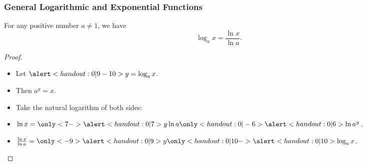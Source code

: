 \begin{frame}
\frametitle{General Logarithmic and Exponential Functions}
\begin{theorem}
For any positive number $a \neq 1$, we have
\[
\log_a x = \frac{\ln x}{\ln a} .
\]
\end{theorem}
\begin{proof}
\begin{itemize}
\item<2->  Let $\alert<handout:0| 9-10>{y = \log_a x}$.
\item<3->  Then $a^y = x$.
\item<4->  Take the natural logarithm of both sides:
\item<5->  $\ln x=\only<7->{\alert<handout:0| 7>{y \ln a}}\only<handout:0| -6>{\alert<handout:0| 6>{\ln a^y}} $.
\item<8->  $\frac{\ln x}{\ln a}=\only<-9>{\alert<handout:0| 9>{y}}\only<handout:0| 10->{\alert<handout:0| 10>{\log_a x}} $.
\end{itemize}
\end{proof}
\end{frame}
